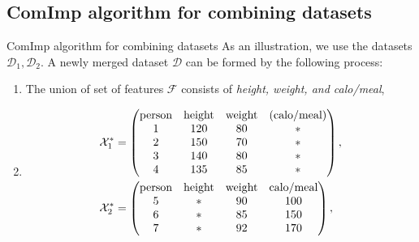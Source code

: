 \documentclass[xcolor={dvipsnames}]{beamer} %
\begin{document}
\subsection{ComImp algorithm for combining datasets}
\begin{frame}{ComImp algorithm for combining datasets}
    As an illustration, we use the datasets $\mathcal{D}_1, \mathcal{D}_2$. A newly merged dataset $\mathcal{D}$ can be formed by the following process:
    \begin{enumerate}
    \item The union of set of features $\mathcal{F}$ consists of \textit{height, weight, and calo/meal},
    \item
    \begin{align*}
    \small
        \mathcal{X}^*_1&= 
        \begin{pmatrix}
    \text{person} &\text{height} & \text{weight} & \text{(calo/meal)}\\
    1 & 120 & 80 & *\\
    2 & 150 & 70 & *\\
    3 & 140 & 80 & *\\
    4 & 135 & 85 & *
    \end{pmatrix},\\
        \mathcal{X}^*_2&= 
        \begin{pmatrix}
    \text{person} &\text{height} & \text{weight} & \text{calo/meal}\\
    5 & * & 90 & 100 \\
    6 & * & 85 & 150\\
    7 & * & 92 & 170
    \end{pmatrix},
\end{align*}
\end{enumerate}
\end{frame}
\end{document}
